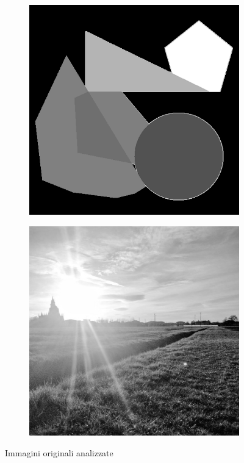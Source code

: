 \begin{figure}
    \centering
    \begin{subfigure}[b]{0.5\textwidth}
        \centering
        \includegraphics[width=0.5\linewidth]{./img/img1.png}\label{fig:img1}
    \end{subfigure}\hfill
    \begin{subfigure}[b]{0.5\textwidth}
        \centering
        \includegraphics[width=0.5\linewidth]{./img/paesaggio.png}\label{fig:paesaggio}
    \end{subfigure}
    \caption{Immagini originali analizzate}
\end{figure}
    
